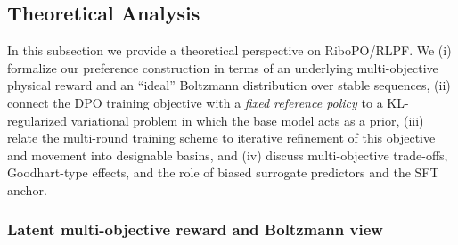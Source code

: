 {{%






\subsection{Theoretical Analysis}
\label{app:theory}

In this subsection we provide a theoretical perspective on RiboPO/RLPF.
We (i) formalize our preference construction in terms of an underlying
multi-objective physical reward and an ``ideal'' Boltzmann distribution over
stable sequences, (ii) connect the DPO training objective with a \emph{fixed
reference policy} to a KL-regularized variational problem in which the base
model acts as a prior, (iii) relate the multi-round training scheme to
iterative refinement of this objective and movement into designable basins,
and (iv) discuss multi-objective trade-offs, Goodhart-type effects, and the
role of biased surrogate predictors and the SFT anchor.

\subsubsection{Latent multi-objective reward and Boltzmann view}

}}
